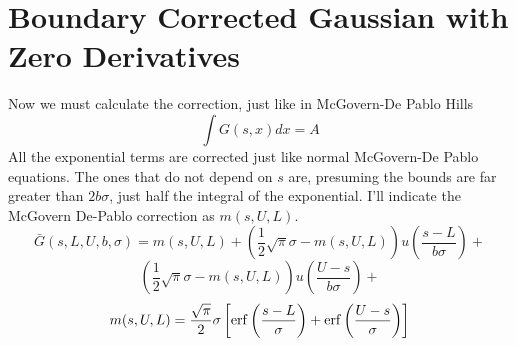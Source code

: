 \documentclass{article}
\newcommand{\erf}{\mathop{\rm erf}\nolimits}
\begin{document}
\section{Boundary Corrected Gaussian with Zero Derivatives}
Now we must calculate the correction, just like in McGovern-De Pablo
Hills
\[
\int G(s,x) dx = A
\]
All the exponential terms are corrected just like normal McGovern-De
Pablo equations. The ones that do not depend on $s$ are, presuming the
bounds are far greater than $2b\sigma$, just half the integral of the
exponential. I'll indicate the McGovern De-Pablo correction as
$m(s,U,L)$.
\[
\bar{G}(s,L,U,b,\sigma) = m(s,U,L) + \left(\frac{1}{2}\sqrt{\pi}\sigma - m(s,U,L)\right)u(\frac{s-L}{b\sigma}) + 
\]
\begin{equation}
\left(\frac{1}{2}\sqrt{\pi}\sigma - m(s,U,L)\right)u(\frac{U-s}{b\sigma}) + 
\end{equation}
\begin{equation}
m(s,U,L) = \frac{\sqrt{\pi}}{2} \sigma \left[\erf\left(\frac{s - L}{\sigma}\right) + \erf\left(\frac{U - s}{\sigma}\right)\right]
\end{equation}
\end{document}
